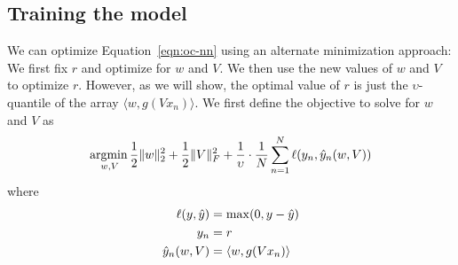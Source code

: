 \begin{comment}
\subsection{Connection to OC-SVM}
\label{sec:connection_to_OC-SVM}

Clearly, Equation~\ref{eqn:oc-nn} is the special case of the Equation~\ref{eqn:ocsvm-objective} presented in the Section~\ref{sec:ocsvm}, where the weights $V$  in Equation~\ref{eqn:oc-nn} are randomly initialised, and not optimised, and $g$ is the either a $linear$ and $sigmoid$ activations.
More generally, for a deep network with parameters $w$, we have

\begin{equation}
\label{eqn:gen-oc-nn}
 \min_{w,\bias} \frac{1}{2} \| w \|_{2}^2 +\frac{1}{\nu} \cdot \frac{1}{N} \sum_{i = 1}^N \max( 0, \bias - \langle w, \Phi( \X_{n :} w ) \rangle ) - \bias
\end{equation}
\end{comment}

\vspace{-0.1cm}
\subsection{Training the model}
\label{sec:training}
We can optimize Equation~\ref{eqn:oc-nn} using an alternate minimization approach: We first fix $r$ and optimize for $w$ and $V$. We then use
the new values of $w$ and $V$ to optimize $r$. However, as we  will show, the optimal value of $r$ is just the $\upsilon$-quantile of
the array $\langle w,g(Vx_{n})\rangle$. We first define the objective to solve for $w$ and $V$ as
\begin{equation}
                \label{eqn:minimize_w_V}
                 \underset{w, V}{\operatorname{argmin}\,} \frac{1}{2} \| w \|_{2}^2 + \frac{1}{2} \| V \|_F^2 + \frac{1}{\upsilon} \cdot \frac{1}{N} \sum_{n = 1}^N \ell( y_n, \hat{y}_n( w, V ) )
                 \end{equation}
                where
                \begin{align*}
                        \ell( y, \hat{y} ) &= \max( 0, y - \hat{y} ) \\
                        y_n       &= r \\
                        \hat{y}_n( w, V ) &= \langle w, g( V x_n ) \rangle
                \end{align*}

